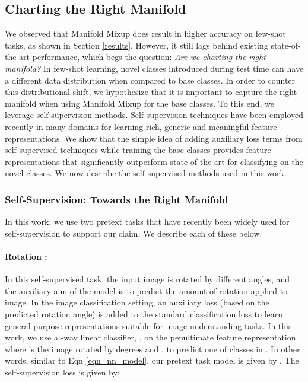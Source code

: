 \documentclass[10pt,twocolumn,letterpaper]{article}
\begin{document}
\subsection{Charting the Right Manifold}
We observed that Manifold Mixup does result in higher accuracy on few-shot tasks, as shown in Section \ref{results}. However, it still lags behind existing state-of-the-art performance, which begs the question: \textit{Are we charting the right manifold?} In few-shot learning, novel classes introduced during test time can have a different data distribution when compared to base classes. In order to counter this distributional shift, we hypothesize that it is important to capture the right manifold when using Manifold Mixup for the base classes. To this end, we leverage self-supervision methods.
Self-supervision techniques have been employed recently in many domains for learning rich, generic and meaningful feature representations. We show that the simple idea of adding auxiliary loss terms from self-supervised techniques while training the base classes provides feature representations that significantly outperform state-of-the-art for classifying on the novel classes. We now describe the self-supervised methods used in this work.

\subsubsection{Self-Supervision: Towards the Right Manifold}
\label{selfsupervision}
In this work, we use two pretext tasks that have recently been widely used for self-supervision to support our claim. We describe each of these below.
\paragraph{Rotation \cite{Spyros2018rotate}:}
In this self-supervised task, the input image is rotated by different angles, and the auxiliary aim of the model is to predict the amount of rotation applied to image. In the image classification setting, an auxiliary loss (based on the predicted rotation angle) is added to the standard classification loss to learn general-purpose representations suitable for image understanding tasks. In this work, we use a -way linear classifier, , on the penultimate feature representation  where  is the image  rotated by  degrees and , to predict one of  classes in . In other words, similar to Eqn \ref{eqn_nn_model}, our pretext task model is given by . The self-supervision loss is given by:
\end{document}
